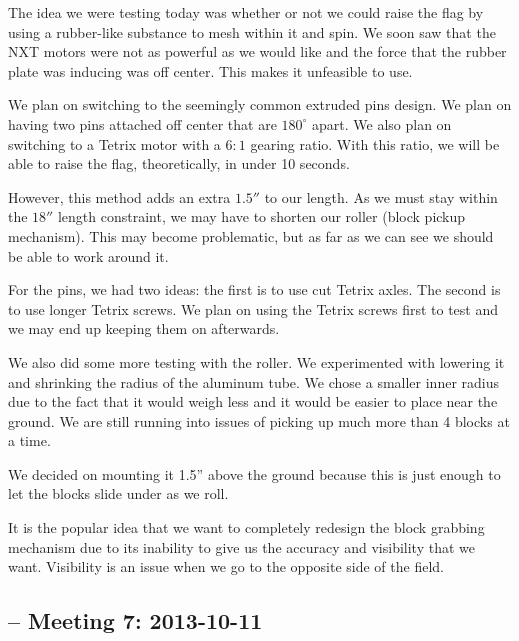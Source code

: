 The idea we were testing today was whether or not we could raise the flag by using a rubber-like substance to mesh within it and spin. We soon saw that the NXT motors were not as powerful as we would like and the force that the rubber plate was inducing was off center. This makes it unfeasible to use. 

We plan on switching to the seemingly common extruded pins design. We plan on having two pins attached off center that are $180^\circ$ apart. We also plan on switching to a Tetrix motor with a $6:1$ gearing ratio. With this ratio, we will be able to raise the flag, theoretically, in under 10 seconds. 

However, this method adds an extra $1.5''$ to our length. As we must stay within the $18''$ length constraint, we may have to shorten our roller (block pickup mechanism). This may become problematic, but as far as we can see we should be able to work around it. 

For the pins, we had two ideas: the first is to use cut Tetrix axles. The second is to use longer Tetrix screws. We plan on using the Tetrix screws first to test and we may end up keeping them on afterwards. 

We also did some more testing with the roller. We experimented with lowering it and shrinking the radius of the aluminum tube. We chose a smaller inner radius due to the fact that it would weigh less and it would be easier to place near the ground. We are still running into issues of picking up much more than 4 blocks at a time. 

We decided on mounting it 1.5'' above the ground because this is just enough to let the blocks slide under as we roll. 

It is the popular idea that we want to completely redesign the block grabbing mechanism due to its inability to give us the accuracy and visibility that we want. Visibility is an issue when we go to the opposite side of the field. 

\newpage \subsection{-- Meeting 7: 2013-10-11}